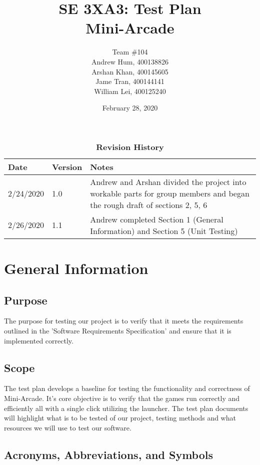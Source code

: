 \documentclass[12pt, titlepage]{article}
\title{SE 3XA3: Test Plan\\Mini-Arcade}
\author{Team \#104
		\\ Andrew Hum, 400138826
		\\ Arshan Khan, 400145605
		\\ Jame Tran, 400144141
		\\ William Lei, 400125240
}
\date{February 28, 2020}
\begin{document}
\maketitle

\tableofcontents
\listoftables
\listoffigures

\begin{table}[bp]
\caption{\bf Revision History}
\begin{tabularx}{\textwidth}{p{3cm}p{2cm}X}
\toprule {\bf Date} & {\bf Version} & {\bf Notes}\\
\midrule
2/24/2020 & 1.0 & Andrew and Arshan divided the project into workable parts for group members and began the rough draft of sections 2, 5, 6\\
2/26/2020 & 1.1 & Andrew completed Section 1 (General Information) and Section 5 (Unit Testing)\\
\bottomrule
\end{tabularx}
\end{table}

\newpage


\section{General Information}

\subsection{Purpose}

The purpose for testing our project is to verify that it meets the requirements outlined in the 'Software Requirements Specification' and ensure that it is implemented correctly.

\subsection{Scope}

The test plan develops a baseline for testing the functionality and correctness of Mini-Arcade. It's core objective is to verify that the games run correctly and efficiently all with a single click utilizing the launcher. The test plan documents will highlight what is to be tested of our project, testing methods and what resources we will use to test our software.

\subsection{Acronyms, Abbreviations, and Symbols}
	
\end{document}
